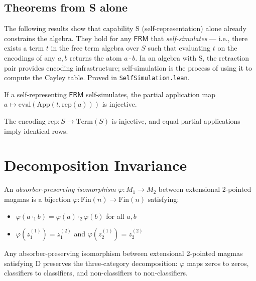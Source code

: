 \documentclass[sigconf,screen,review,anonymous]{acmart}
\newcommand{\dotop}{\cdot}
\newcommand{\FRM}{\textsf{FRM}}
\newcommand{\Fin}{\mathrm{Fin}}
\begin{document}
\subsection{Theorems from S alone}

The following results show that capability S (self-representation) alone already constrains the algebra. They hold for any $\FRM$ that \emph{self-simulates} — i.e., there exists a term $t$ in the free term algebra over $S$ such that evaluating $t$ on the encodings of any $a, b$ returns the atom $a \dotop b$. In an algebra with S, the retraction pair provides encoding infrastructure; self-simulation is the process of using it to compute the Cayley table. Proved in \texttt{SelfSimulation.lean}.

\begin{theorem}
\label{thm:injectivity}
If a self-representing $\FRM$ self-simulates, the partial application map $a \mapsto \text{eval}(\text{App}(t, \text{rep}(a)))$ is injective.
\end{theorem}

\begin{corollary}
The encoding $\text{rep} : S \to \text{Term}(S)$ is injective, and equal partial applications imply identical rows.
\end{corollary}

\section{Decomposition Invariance}
\label{sec:invariance}

\begin{definition}
An \emph{absorber-preserving isomorphism} $\varphi : M_1 \to M_2$ between extensional 2-pointed magmas is a bijection $\varphi : \Fin(n) \to \Fin(n)$ satisfying:
\begin{itemize}
  \item $\varphi(a \dotop_1 b) = \varphi(a) \dotop_2 \varphi(b)$ for all $a, b$
  \item $\varphi(z_1^{(1)}) = z_1^{(2)}$ and $\varphi(z_2^{(1)}) = z_2^{(2)}$
\end{itemize}
\end{definition}

\begin{theorem}[Functoriality]
\label{thm:functoriality}
Any absorber-preserving isomorphism between extensional 2-pointed magmas satisfying D preserves the three-category decomposition: $\varphi$ maps zeros to zeros, classifiers to classifiers, and non-classifiers to non-classifiers.
\end{theorem}
\end{document}
